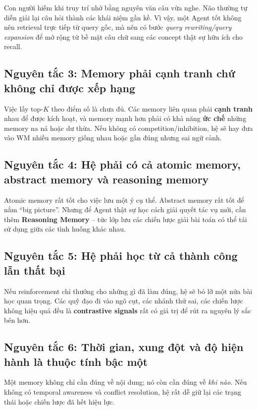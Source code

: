 \documentclass[a4paper,12pt]{article}
\begin{document}
Con người hiếm khi truy trí nhớ bằng nguyên văn câu vừa nghe. Não thường tự diễn giải lại câu hỏi thành các khái niệm gần kề. Vì vậy, một Agent tốt không nên retrieval trực tiếp từ query gốc, mà nên có bước \emph{query rewriting/query expansion} để mở rộng từ bề mặt câu chữ sang các concept thật sự hữu ích cho recall.

\subsection*{Nguyên tắc 3: Memory phải cạnh tranh chứ không chỉ được xếp hạng}

Việc lấy top-$K$ theo điểm số là chưa đủ. Các memory liên quan phải \textbf{cạnh tranh} nhau để được kích hoạt, và memory mạnh hơn phải có khả năng \textbf{ức chế} những memory na ná hoặc dư thừa. Nếu không có competition/inhibition, hệ sẽ hay đưa vào WM nhiều memory giống nhau hoặc gần đúng nhưng sai ngữ cảnh.

\subsection*{Nguyên tắc 4: Hệ phải có cả atomic memory, abstract memory và reasoning memory}

Atomic memory rất tốt cho việc lưu một ý cụ thể. Abstract memory rất tốt để nắm ``big picture''. Nhưng để Agent thật sự học cách giải quyết tác vụ mới, cần thêm \textbf{Reasoning Memory} -- tức lớp lưu các chiến lược giải bài toán có thể tái sử dụng giữa các tình huống khác nhau.

\subsection*{Nguyên tắc 5: Hệ phải học từ cả thành công lẫn thất bại}

Nếu reinforcement chỉ thưởng cho những gì đã làm đúng, hệ sẽ bỏ lỡ một nửa bài học quan trọng. Các quỹ đạo đi vào ngõ cụt, các nhánh thử sai, các chiến lược không hiệu quả đều là \textbf{contrastive signals} rất có giá trị để rút ra nguyên lý sắc bén hơn.

\subsection*{Nguyên tắc 6: Thời gian, xung đột và độ hiện hành là thuộc tính bậc một}

Một memory không chỉ cần đúng về nội dung; nó còn cần đúng về \emph{khi nào}. Nếu không có temporal awareness và conflict resolution, hệ rất dễ giữ lại các trạng thái hoặc chiến lược đã hết hiệu lực.
\end{document}
